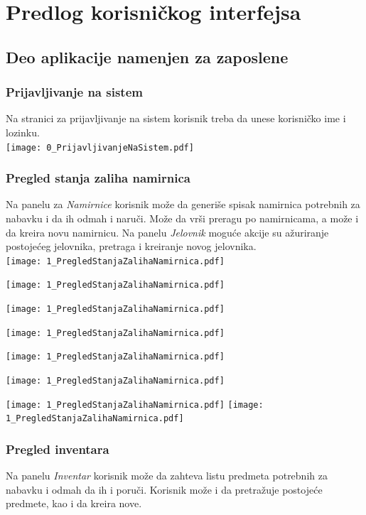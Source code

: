 \documentclass{article}
\begin{document}

\section{Predlog korisničkog interfejsa}

\subsection{Deo aplikacije namenjen za zaposlene}
\subsubsection{Prijavljivanje na sistem}
Na stranici za prijavljivanje na sistem korisnik treba da unese korisničko ime i lozinku.\\

\texttt{[image: 0\_PrijavljivanjeNaSistem.pdf]}

\subsubsection{Pregled stanja zaliha namirnica}
Na panelu za \emph{Namirnice} korisnik može da generiše spisak namirnica potrebnih za nabavku i da ih odmah i naruči. Može da vrši preragu po namirnicama, a može i da kreira novu namirnicu. Na panelu \emph{Jelovnik} moguće akcije su ažuriranje postojećeg jelovnika, pretraga i kreiranje novog jelovnika.\\

\texttt{[image: 1\_PregledStanjaZalihaNamirnica.pdf]}

\texttt{[image: 1\_PregledStanjaZalihaNamirnica.pdf]}

\texttt{[image: 1\_PregledStanjaZalihaNamirnica.pdf]}

\texttt{[image: 1\_PregledStanjaZalihaNamirnica.pdf]}

\texttt{[image: 1\_PregledStanjaZalihaNamirnica.pdf]}
\vfill

\texttt{[image: 1\_PregledStanjaZalihaNamirnica.pdf]}
\vfill

\texttt{[image: 1\_PregledStanjaZalihaNamirnica.pdf]}
\vfill
\texttt{[image: 1\_PregledStanjaZalihaNamirnica.pdf]}
\vfill

\subsubsection{Pregled inventara}
Na panelu \emph{Inventar} korisnik može da zahteva listu predmeta potrebnih za nabavku i odmah da ih i poruči. Korisnik može i da pretražuje postojeće predmete, kao i da kreira nove.\\\\
\end{document}
